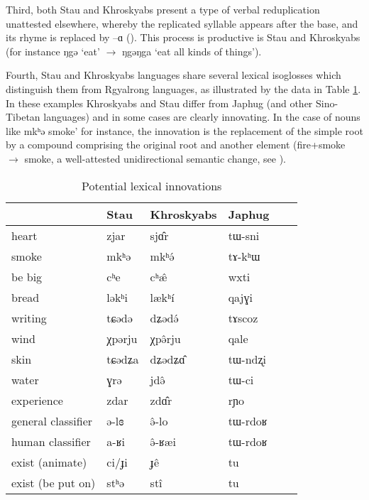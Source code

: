 \documentclass[oneside,a4paper,11pt]{article}
\newcommand{\ipa}[1]{{\phon #1}} %
\begin{document}
Third, both Stau and Khroskyabs present a type of verbal reduplication unattested elsewhere, whereby the replicated syllable appears after the base, and its rhyme is replaced by \ipa{--ɑ} (\citealt{lai13fuyin}). This process is productive is Stau and Khroskyabs (for instance \ipa{ŋgə} `eat' $\rightarrow$ \ipa{ŋgəŋga} `eat all kinds of things').
 
 
 Fourth, Stau and Khroskyabs languages share several lexical isoglosses which distinguish them from Rgyalrong languages, as illustrated by the data in Table \ref{tab:lexicon}. In  these examples Khroskyabs and Stau differ from Japhug (and other Sino-Tibetan languages) and in some cases are clearly innovating. In the case of nouns like \ipa{mkʰə}  smoke' for instance, the innovation is the replacement of the simple root by a compound comprising the original root and another element (fire+smoke $\rightarrow$ smoke, a well-attested unidirectional semantic change, see \citealt{urban11semantic}). 
 
  \begin{table}[h]
  \caption{Potential lexical innovations} \label{tab:lexicon} \centering
 \begin{tabular}{llllll}
 \toprule
 &	Stau &	Khroskyabs &	Japhug &	\\	
  \midrule
heart &	\ipa{zjar}  &	\ipa{sjɑ̂r} &	\ipa{tɯ-sni} &	\\	
smoke  &	\ipa{mkʰə} &	\ipa{mkʰə́} &	\ipa{tɤ-kʰɯ} &	\\	
be big  &	\ipa{cʰe} &	\ipa{cʰæ̂} &	\ipa{wxti} &	\\	
bread  &	\ipa{ləkʰi} &	\ipa{lækʰí} &	\ipa{qajɣi} &	\\	
writing  &	\ipa{tɕədə} &	\ipa{dʑədə́} &	\ipa{tɤscoz} &	\\	
wind  &	\ipa{χpərju} &	\ipa{χpə̂rju    } &	\ipa{qale} &	\\	
skin  &	\ipa{tɕədʑa} &	\ipa{dʑədʑɑ̂} &	\ipa{tɯ-ndʐi} &	\\	
water  &	\ipa{ɣrə} &	\ipa{jdə̂} &	\ipa{tɯ-ci} &	\\
experience  &	\ipa{zdar} &	\ipa{zdɑ̂r} &	\ipa{rɲo} &	\\	
  \midrule
general classifier  &	\ipa{ə-lɞ} &	\ipa{ə̂-lo} &	\ipa{tɯ-rdoʁ} &	\\	
human classifier  &	\ipa{a-ʁi} &	\ipa{ə̂-ʁæi} &	\ipa{tɯ-rdoʁ} &	\\	
  \midrule
exist (animate)  &	\ipa{ci/ɟi} &	\ipa{ɟê} &	\ipa{tu} &	\\	
exist (be put on)  &	\ipa{stʰə} &	\ipa{stî} &	\ipa{tu} &	\\	
\bottomrule
\end{tabular}
\end{table}
\end{document}

